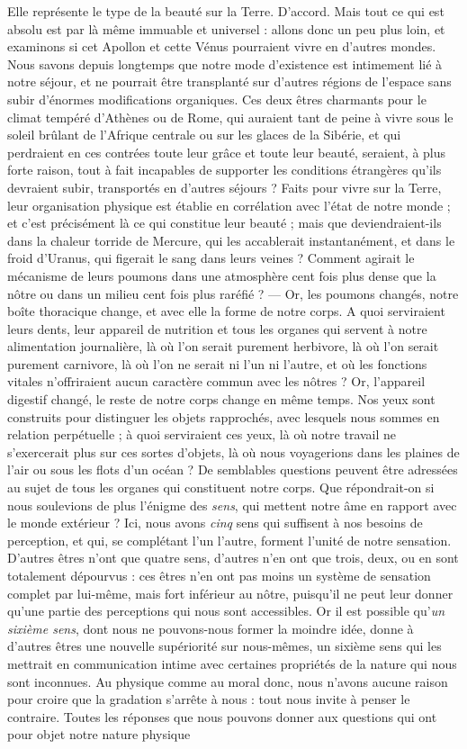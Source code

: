 \documentclass[a4paper, 11pt, oneside, landscape]{article}
\begin{document}
Elle représente le type de la beauté sur la Terre. D'accord. Mais tout ce qui est absolu est par là même immuable et universel : allons donc un peu plus loin, et examinons si cet Apollon et cette Vénus pourraient vivre en d'autres mondes. Nous savons depuis longtemps que notre mode d'existence est intimement lié à notre séjour, et ne pourrait être transplanté sur d'autres régions de l'espace sans subir d'énormes modifications organiques. Ces deux êtres charmants pour le climat tempéré d'Athènes ou de Rome, qui auraient tant de peine à vivre sous le soleil brûlant de l'Afrique centrale ou sur les glaces de la Sibérie, et qui perdraient en ces contrées toute leur grâce et toute leur beauté, seraient, à plus forte raison, tout à fait incapables de supporter les conditions étrangères qu'ils devraient subir, transportés en d'autres séjours ? Faits pour vivre sur la Terre, leur organisation physique est établie en corrélation avec l'état de notre monde ; et c'est précisément là ce qui constitue leur beauté ; mais que deviendraient-ils dans la chaleur torride de Mercure, qui les accablerait instantanément, et dans le froid d'Uranus, qui figerait le sang dans leurs veines ? Comment agirait le mécanisme de leurs poumons dans une atmosphère cent fois plus dense que la nôtre ou dans un milieu cent fois plus raréfié ? --- Or, les poumons changés, notre boîte thoracique change, et avec elle la forme de notre corps. A quoi serviraient leurs dents, leur appareil de nutrition et tous les organes qui servent à notre alimentation journalière, là où l'on serait purement herbivore, là où l'on serait purement carnivore, là où l'on ne serait ni l'un ni l'autre, et où les fonctions vitales n'offriraient aucun caractère commun avec les nôtres ? Or, l'appareil digestif changé, le reste de notre corps change en même temps. Nos yeux sont construits pour distinguer les objets rapprochés, avec lesquels nous sommes en relation perpétuelle ; à quoi serviraient ces yeux, là où notre travail ne s'exercerait plus sur ces sortes d'objets, là où nous voyagerions dans les plaines de l'air ou sous les flots d'un océan ? De semblables questions peuvent être adressées au sujet de tous les organes qui constituent notre corps. Que répondrait-on si nous soulevions de plus l'énigme des \emph{sens}, qui mettent notre âme en rapport avec le monde extérieur ? Ici, nous avons \emph{cinq} sens qui suffisent à nos besoins de perception, et qui, se complétant l'un l'autre, forment l'unité de notre sensation. D'autres êtres n'ont que quatre sens, d'autres n'en ont que trois, deux, ou en sont totalement dépourvus : ces êtres n'en ont pas moins un système de sensation complet par lui-même, mais fort inférieur au nôtre, puisqu'il ne peut leur donner qu'une partie des perceptions qui nous sont accessibles. Or il est possible qu'\emph{un sixième sens}, dont nous ne pouvons-nous former la moindre idée, donne à d'autres êtres une nouvelle supériorité sur nous-mêmes, un sixième sens qui les mettrait en communication intime avec certaines propriétés de la nature qui nous sont inconnues. Au physique comme au moral donc, nous n'avons aucune raison pour croire que la gradation s'arrête à nous : tout nous invite à penser le contraire. Toutes les réponses que nous pouvons donner aux questions qui ont pour objet notre nature physique 
\end{document}
